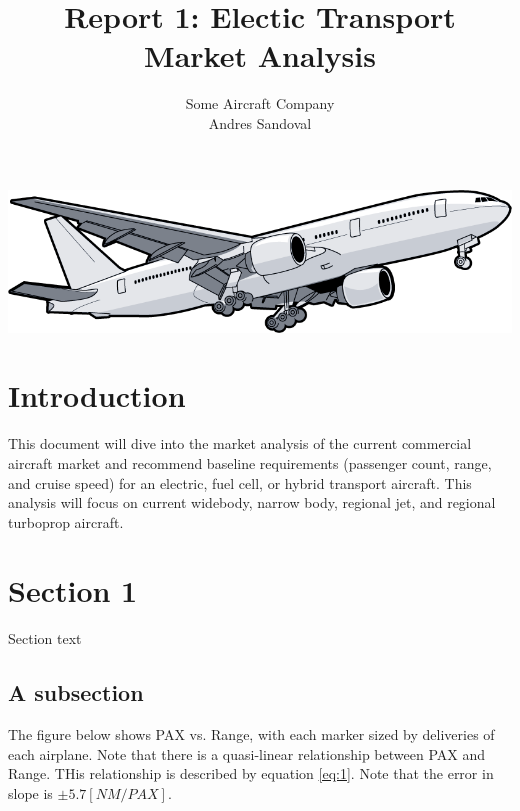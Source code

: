 \documentclass[12pt]{article} %
\title{Report 1: Electic Transport Market Analysis}
\author{Some Aircraft Company \\ Andres Sandoval}
\begin{document}
\maketitle
\begin{center}
    \includegraphics[width=1\textwidth]{cover}
\end{center}

\graphicspath{ {./market_trade/} }

\pagebreak

\tableofcontents

\listoffigures

\pagebreak

\section{Introduction}

This document will dive into the market analysis of the current commercial aircraft market and recommend baseline requirements (passenger count, range, and cruise speed) for an electric, fuel cell, or hybrid transport aircraft. This analysis will focus on current widebody, narrow body, regional jet, and regional turboprop aircraft. 

\section{Section 1}

Section text

\subsection{A subsection}

The figure below shows PAX vs. Range, with each marker sized by deliveries of each airplane. Note that there is a quasi-linear relationship between PAX and Range. THis relationship is described by equation \ref{eq:1}. Note that the error in slope is $\pm 5.7 [NM/PAX]$.
\end{document}
